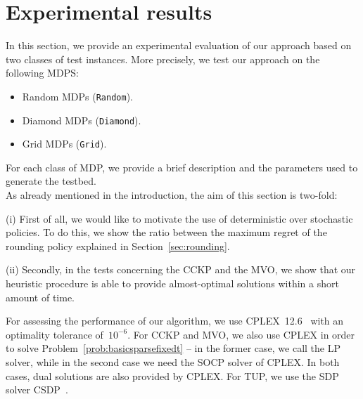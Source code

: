 \section{Experimental results}\label{sec:experiments}

In this section, we provide an experimental evaluation of our approach
based on two classes of test instances. More precisely, we test our approach on the following MDPS:
\begin{itemize}
\item Random MDPs (\texttt{Random}).
\item Diamond MDPs (\texttt{Diamond}).
\item Grid MDPs (\texttt{Grid}).
\end{itemize}

For each class of MDP, we provide a brief description and the parameters used to generate the testbed.\\

As already mentioned in the introduction, the aim of this section is two-fold:

(i) First of all, we would like to motivate the use of deterministic over stochastic policies. To do this, we show the ratio between the maximum regret of the rounding policy explained in Section~\ref{sec:rounding}. 
%

(ii) Secondly, in the tests concerning the CCKP and the MVO, we show that our heuristic procedure is able to provide almost-optimal solutions within a short amount of time.

For assessing the performance of our algorithm, we use CPLEX~12.6~\cite{cplex126} with an optimality tolerance of~$10^{-6}$. For CCKP and MVO, we also use CPLEX in order to solve Problem~\eqref{prob:basicsparsefixedt} -- in the former case, we call the LP solver, while in the second case we need the SOCP solver of CPLEX. In both cases, dual solutions are also provided by CPLEX. For TUP, we use the SDP solver CSDP~\cite{csdp}.


